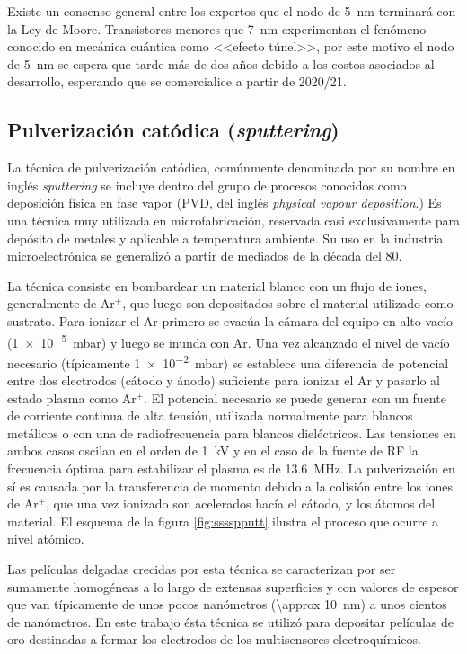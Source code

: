 		Existe un consenso general entre los expertos que el nodo de \SI{5}{\nm} terminará con la Ley de Moore. Transistores menores que \SI{7}{\nm} experimentan el fenómeno conocido en mecánica cuántica como <<efecto túnel>>, por este motivo el nodo de \SI{5}{\nm} se espera que tarde más de dos años debido a los costos asociados al desarrollo, esperando que se comercialice a partir de 2020/21. \cite{samsungnewsroom,Kayashima2007,Wikipdia2018}

	\subsection{Pulverización catódica (\textit{sputtering})}
				
		La técnica de pulverización catódica, comúnmente denominada por su nombre en inglés \textit{sputtering} se incluye dentro del grupo de procesos conocidos como deposición física en fase vapor (PVD, del inglés \textit{physical vapour deposition}.) Es una técnica muy utilizada en microfabricación, reservada casi exclusivamente para depósito de metales y aplicable a temperatura ambiente. Su uso en la industria microelectrónica se generalizó a partir de mediados de la década del 80.\cite{Depla2010,Kelly2000}

		La técnica consiste en bombardear un material blanco con un flujo de iones, generalmente de Ar$^+$, que luego son depositados sobre el material utilizado como sustrato. Para ionizar el Ar primero se evacúa la cámara del equipo en alto vacío (\SI{1e-5}{\milli\bar}) y luego se inunda con Ar. Una vez alcanzado el nivel de vacío necesario (típicamente \SI{1e-2}{\milli\bar}) se establece una diferencia de potencial entre dos electrodos (cátodo y ánodo) suficiente para ionizar el Ar y pasarlo al estado plasma como Ar$^{+}$. El potencial necesario se puede generar con un fuente de corriente continua de alta tensión, utilizada normalmente para blancos metálicos o con una de radiofrecuencia para blancos dieléctricos. Las tensiones en ambos casos oscilan en el orden de \SI{1}{\kilo\volt} y en el caso de la fuente de RF la frecuencia óptima para estabilizar el plasma es de \SI{13.6}{\mega\hertz}. La pulverización en sí es causada por la transferencia de momento debido a la colisión entre los iones de Ar$^+$, que una vez ionizado son acelerados hacía el cátodo, y los átomos del material. El esquema de la figura \ref{fig:sssspputt} ilustra el proceso que ocurre a nivel atómico. \cite{Behrisch1981,sigmund1968,Bhatt2007}
	
		Las películas delgadas crecidas por esta técnica se caracterizan por ser sumamente homogéneas a lo largo de extensas superficies y con valores de espesor que van típicamente de unos pocos nanómetros (\SI{\approx 10}{\nm}) a unos cientos de nanómetros. En este trabajo ésta técnica se utilizó para depositar películas de oro destinadas a formar los electrodos de los multisensores electroquímicos.

